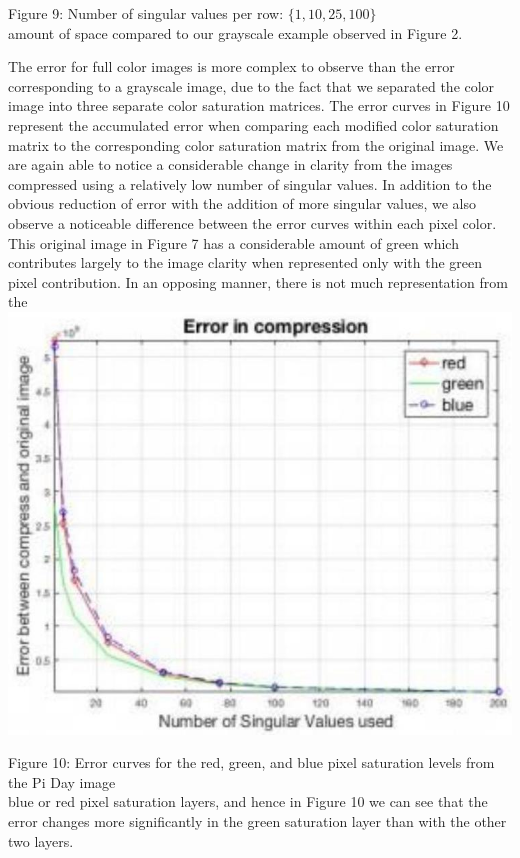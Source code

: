 \documentclass[10pt]{article}
\begin{document}
Figure 9: Number of singular values per row: $\{1,10,25,100\}$\\
amount of space compared to our grayscale example observed in Figure 2.

The error for full color images is more complex to observe than the error corresponding to a grayscale image, due to the fact that we separated the color image into three separate color saturation matrices. The error curves in Figure 10 represent the accumulated error when comparing each modified color saturation matrix to the corresponding color saturation matrix from the original image. We are again able to notice a considerable change in clarity from the images compressed using a relatively low number of singular values. In addition to the obvious reduction of error with the addition of more singular values, we also observe a noticeable difference between the error curves within each pixel color. This original image in Figure 7 has a considerable amount of green which contributes largely to the image clarity when represented only with the green pixel contribution. In an opposing manner, there is not much representation from the\\
\includegraphics[max width=\textwidth, center]{2025_04_09_7d70d965b908bc4c1892g-6}

Figure 10: Error curves for the red, green, and blue pixel saturation levels from the Pi Day image\\
blue or red pixel saturation layers, and hence in Figure 10 we can see that the error changes more significantly in the green saturation layer than with the other two layers.
\end{document}
